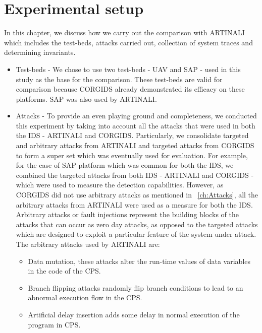 \section{Experimental setup}
In this chapter, we discuss how we carry out the comparison with ARTINALI which includes the test-beds, attacks carried out, collection of system traces and determining invariants. 
\begin{itemize}
\item Test-beds - We chose to use two test-beds - \ac{UAV} and \ac{SAP} - used in this study as the base for the comparison. These test-beds are valid for comparison because \ac{CORGIDS} already demonstrated its efficacy on these platforms. \ac{SAP} was also used by ARTINALI.

\item Attacks - To provide an even playing ground and completeness, we conducted this experiment by taking into account all the attacks that were used in both the \ac{IDS} - ARTINALI and \ac{CORGIDS}. Particularly, we consolidate targeted and arbitrary attacks from ARTINALI and targeted attacks from \ac{CORGIDS} to form a super set which was eventually used for evaluation. For example, for the case of \ac{SAP} platform which was common for both the \ac{IDS}, we combined the targeted attacks from both \ac{IDS} - ARTINALI and \ac{CORGIDS} - which were used to measure the detection capabilities. However, as \ac{CORGIDS} did not use arbitrary attacks as mentioned in ~\autoref{ch:Attacks}, all the arbitrary attacks from ARTINALI were used as a measure for both the \ac{IDS}.
Arbitrary attacks or fault injections represent the building blocks of the attacks that can occur as zero day attacks, as opposed to the targeted attacks which are designed to exploit a particular feature of the system under attack. The arbitrary attacks used by ARTINALI are:

\begin{itemize}
\item Data mutation, these attacks alter the run-time values of data variables in the code of the \ac{CPS}.
\item Branch flipping attacks randomly flip branch conditions to lead to an abnormal execution flow in the \ac{CPS}.
\item Artificial delay insertion adds some delay in normal execution of the program in \ac{CPS}.
\end{itemize}


\end{itemize}
